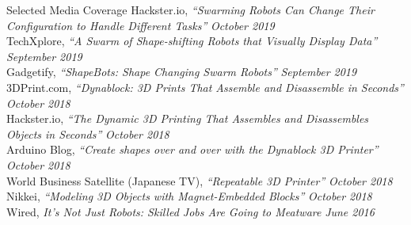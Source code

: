 \documentclass{resume} %
\begin{document}
\begin{rSection}{Selected Media Coverage}
Hackster.io, {\it ``Swarming Robots Can Change Their Configuration to Handle Different Tasks''} \hfill {\em October 2019} \\ 
TechXplore, {\it ``A Swarm of Shape-shifting Robots that Visually Display Data''} \hfill {\em September 2019} \\ 
Gadgetify, {\it ``ShapeBots: Shape Changing Swarm Robots''} \hfill {\em September 2019} \\ 
3DPrint.com, {\it ``Dynablock: 3D Prints That Assemble and Disassemble in Seconds''} \hfill {\em October 2018} \\
Hackster.io, {\it ``The Dynamic 3D Printing That Assembles and Disassembles Objects in Seconds''} \hfill {\em October 2018} \\
Arduino Blog, {\it ``Create shapes over and over with the Dynablock 3D Printer''} \hfill {\em October 2018} \\
World Business Satellite (Japanese TV), {\it ``Repeatable 3D Printer''} \hfill {\em October 2018} \\
Nikkei, {\it ``Modeling 3D Objects with Magnet-Embedded Blocks''} \hfill {\em October 2018} \\
Wired, {\it It's Not Just Robots: Skilled Jobs Are Going to Meatware} \hfill {\em June 2016}
\end{rSection}
\end{document}
